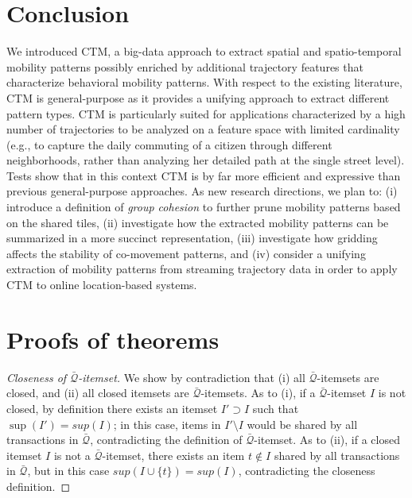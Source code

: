 \documentclass[preprint,12pt,authoryear]{elsarticle} %
\newtheorem{proof}{Proof}
\begin{document}
\section{Conclusion}\label{sec:conclusion}
We introduced CTM, a big-data approach to extract spatial and spatio-temporal mobility patterns possibly enriched by additional trajectory features that characterize behavioral mobility patterns.
With respect to the existing literature, CTM is general-purpose as it provides a unifying approach to extract different pattern types.
CTM is particularly suited for applications characterized by a high number of trajectories to be analyzed on a feature space with limited cardinality (e.g., to capture 
the daily commuting of a citizen through different neighborhoods, rather than analyzing her detailed path at the single street level).
Tests show that in this context CTM is by far more efficient and expressive than previous general-purpose approaches.
As new research directions, we plan to: (i) introduce a definition of \textit{group cohesion} to further prune mobility patterns based on the shared tiles, (ii) investigate how the extracted mobility patterns can be summarized in a more succinct representation, (iii) investigate how gridding affects the stability of co-movement patterns, and (iv) consider a unifying extraction of mobility patterns from streaming trajectory data in order to apply CTM to online location-based systems.

\appendix

\section{Proofs of theorems}\label{ap:proof}

\begin{proof}[Closeness of $\bar{\mathcal{Q}}$-itemset]\label{ap:t1}
We show by contradiction that (i) all $\bar{\mathcal{Q}}$-itemsets are closed, and (ii) all closed itemsets are $\bar{\mathcal{Q}}$-itemsets.
As to (i), if a $\bar{\mathcal{Q}}$-itemset $I$ is not closed, by definition there exists an itemset $I' \supset I$ such that $\sup(I')=sup(I)$; in this case, items in $I' \setminus I$ would be shared by all transactions in $\bar{\mathcal{Q}}$, contradicting the definition of $\bar{\mathcal{Q}}$-itemset.
As to (ii), if a closed itemset $I$ is not a $\bar{\mathcal{Q}}$-itemset, there exists an item $t \not \in I$ shared by all transactions in $\bar{\mathcal{Q}}$, but in this case $sup(I \cup \{t\})=sup(I)$, contradicting the closeness definition.
\end{proof}
\end{document}
